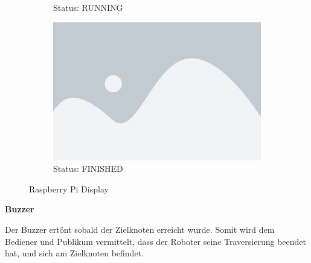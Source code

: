 \begin{figure}[H]
\begin{subfigure}[t]{0.30\textwidth}
    \caption*{Status: RUNNING}
    \end{subfigure}
    \hfill
    \begin{subfigure}[t]{0.30\textwidth}
        \includegraphics[width=\linewidth]{assets/placeholder.png}
    \caption*{Status: FINISHED}
    \end{subfigure}
    \caption{Raspberry Pi Display}
    \label{fig:raspiheader-display}
\end{figure}


\textbf{Buzzer}\label{peripherie-buzzer}

Der Buzzer ertönt sobald der Zielknoten erreicht wurde. Somit wird dem Bediener und Publikum vermittelt, dass der Roboter seine Traversierung beendet hat, und sich am Zielknoten befindet.
